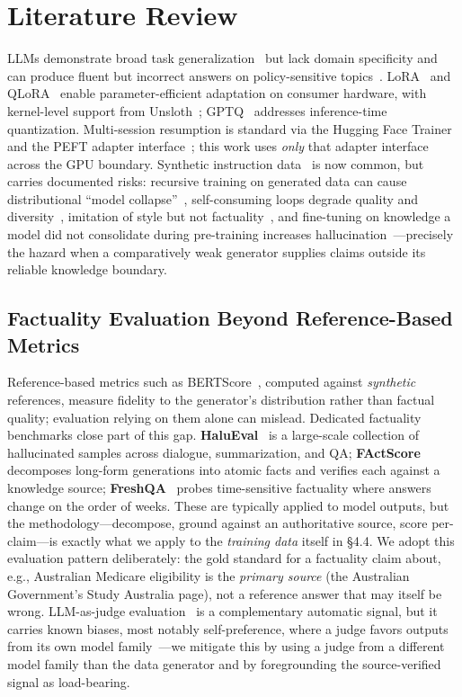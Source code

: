 \documentclass[11pt]{article}
\begin{document}
\section{Literature Review}
LLMs demonstrate broad task generalization~\cite{brown2020,jiang2023,zhao2023} but lack domain specificity and can produce fluent but incorrect answers on policy-sensitive topics~\cite{ippolito2020}. LoRA~\cite{hu2021} and QLoRA~\cite{dettmers2023} enable parameter-efficient adaptation on consumer hardware, with kernel-level support from Unsloth~\cite{unsloth2024}; GPTQ~\cite{frantar2022} addresses inference-time quantization. Multi-session resumption is standard via the Hugging Face Trainer~\cite{wolf2020} and the PEFT adapter interface~\cite{peft2022}; this work uses \emph{only} that adapter interface across the GPU boundary. Synthetic instruction data~\cite{wang2022} is now common, but carries documented risks: recursive training on generated data can cause distributional ``model collapse''~\cite{shumailov2024}, self-consuming loops degrade quality and diversity~\cite{alemohammad2023}, imitation of style but not factuality~\cite{gudibande2023}, and fine-tuning on knowledge a model did not consolidate during pre-training increases hallucination~\cite{gekhman2024,ji2023}---precisely the hazard when a comparatively weak generator supplies claims outside its reliable knowledge boundary.

\subsection{Factuality Evaluation Beyond Reference-Based Metrics}
Reference-based metrics such as BERTScore~\cite{zhang2020}, computed against \emph{synthetic} references, measure fidelity to the generator's distribution rather than factual quality; evaluation relying on them alone can mislead. Dedicated factuality benchmarks close part of this gap. \textbf{HaluEval}~\cite{li2023} is a large-scale collection of hallucinated samples across dialogue, summarization, and QA; \textbf{FActScore}~\cite{min2023} decomposes long-form generations into atomic facts and verifies each against a knowledge source; \textbf{FreshQA}~\cite{vu2023} probes time-sensitive factuality where answers change on the order of weeks. These are typically applied to model outputs, but the methodology---decompose, ground against an authoritative source, score per-claim---is exactly what we apply to the \emph{training data} itself in \S4.4. We adopt this evaluation pattern deliberately: the gold standard for a factuality claim about, e.g., Australian Medicare eligibility is the \emph{primary source} (the Australian Government's Study Australia page), not a reference answer that may itself be wrong. LLM-as-judge evaluation~\cite{zheng2023} is a complementary automatic signal, but it carries known biases, most notably self-preference, where a judge favors outputs from its own model family~\cite{panickssery2024}---we mitigate this by using a judge from a different model family than the data generator and by foregrounding the source-verified signal as load-bearing.
\end{document}
